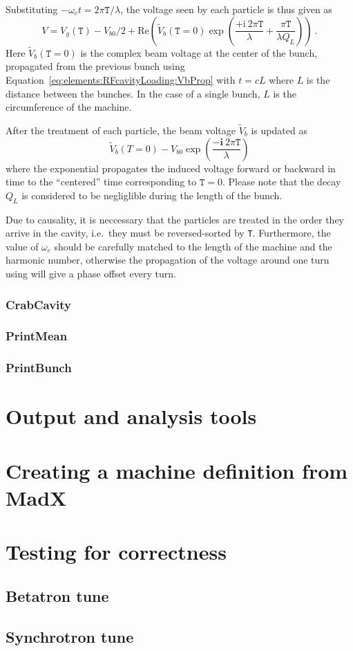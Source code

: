 \documentclass[a4paper]{report}
\begin{document}
Substituting $-\omega_c t = 2\pi \mathtt{T} / \lambda$, the voltage seen by each particle is thus given as
\begin{equation}
  V = V_g(\mathtt{T}) - V_{b0}/2 + \mathrm{Re}\left( \tilde V_b(\mathtt{T}=0) \exp\left(\frac{+\mathrm{i}~2\pi \mathtt{T}}{\lambda} + \frac{\pi \mathtt{T}}{\lambda Q_L} \right) \right)~.
\end{equation}
Here $\tilde V_b(\mathtt{T}=0)$ is the complex beam voltage at the center of the bunch, propagated from the previous bunch using Equation~\eqref{eq:elements:RFcavityLoading:VbProp} with $t=cL$ where $L$ is the distance between the bunches.
In the case of a single bunch, $L$ is the circumference of the machine.

After the treatment of each particle, the beam voltage $\tilde V_b$ is updated as
\begin{equation}
  \tilde V_b(T=0) - V_{b0} \exp \left( \frac{- \mathbf{i} ~ 2\pi \mathtt{T}}{\lambda}  \right)
\end{equation}
where the exponential propagates the induced voltage forward or backward in time to the ``centered'' time corresponding to $\mathtt{T}=0$.
Please note that the decay $Q_L$ is considered to be negliglible during the length of the bunch.

Due to causality, it is neccessary that the particles are treated in the order they arrive in the cavity, i.e.\ they must be reversed-sorted by \texttt{T}.
Furthermore, the value of $\omega_c$ should be carefully matched to the length of the machine and the harmonic number, otherwise the propagation of the voltage around one turn using \label{eq:elements:RFcavityLoading:VbProp} will give a phase offset every turn.

\subsection{CrabCavity}
\subsection{PrintMean}
\subsection{PrintBunch}

\chapter{Output and analysis tools}

\appendix
\chapter{Creating a machine definition from MadX}
\label{sec:MadX}

\chapter{Testing for correctness}
\section{Betatron tune}

\section{Synchrotron tune}
\end{document}
